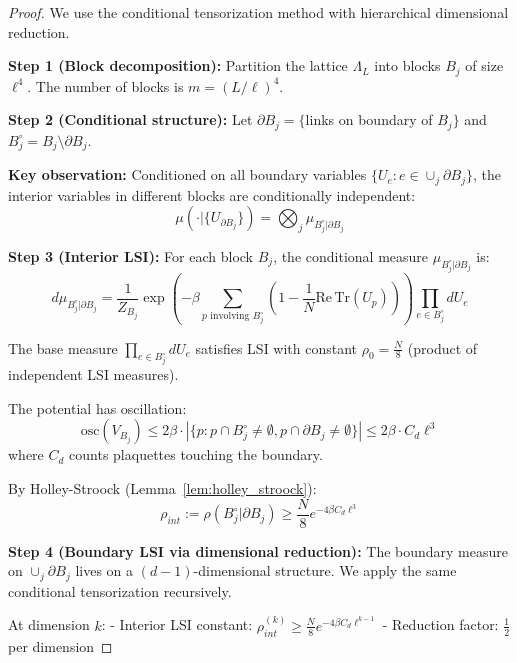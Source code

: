 \begin{proof}
We use the conditional tensorization method with hierarchical dimensional reduction.

\textbf{Step 1 (Block decomposition):}
Partition the lattice $\Lambda_L$ into blocks $B_j$ of size $\ell^4$. The number of blocks is $m = (L/\ell)^4$.

\textbf{Step 2 (Conditional structure):}
Let $\partial B_j = \{$links on boundary of $B_j\}$ and $B_j^\circ = B_j \setminus \partial B_j$.

\textbf{Key observation:} Conditioned on all boundary variables $\{U_e : e \in \cup_j \partial B_j\}$, the interior variables in different blocks are conditionally independent:
\begin{equation}
\mu(\cdot | \{U_{\partial B_j}\}) = \bigotimes_j \mu_{B_j^\circ | \partial B_j}
\end{equation}

\textbf{Step 3 (Interior LSI):}
For each block $B_j$, the conditional measure $\mu_{B_j^\circ | \partial B_j}$ is:
\begin{equation}
d\mu_{B_j^\circ | \partial B_j} = \frac{1}{Z_{B_j}} \exp\left(-\beta \sum_{p \text{ involving } B_j^\circ} (1 - \frac{1}{N}\mathrm{Re}\,\mathrm{Tr}(U_p))\right) \prod_{e \in B_j^\circ} dU_e
\end{equation}

The base measure $\prod_{e \in B_j^\circ} dU_e$ satisfies LSI with constant $\rho_0 = \frac{N}{8}$ (product of independent LSI measures).

The potential has oscillation:
\begin{equation}
\mathrm{osc}(V_{B_j}) \leq 2\beta \cdot |\{p : p \cap B_j^\circ \neq \emptyset, p \cap \partial B_j \neq \emptyset\}| \leq 2\beta \cdot C_d \ell^3
\end{equation}
where $C_d$ counts plaquettes touching the boundary.

By Holley-Stroock (Lemma~\ref{lem:holley_stroock}):
\begin{equation}
\rho_{int} := \rho(B_j^\circ | \partial B_j) \geq \frac{N}{8} e^{-4\beta C_d \ell^3}
\end{equation}

\textbf{Step 4 (Boundary LSI via dimensional reduction):}
The boundary measure on $\cup_j \partial B_j$ lives on a $(d-1)$-dimensional structure. We apply the same conditional tensorization recursively.

At dimension $k$:
- Interior LSI constant: $\rho_{int}^{(k)} \geq \frac{N}{8} e^{-4\beta C_d \ell^{k-1}}$
- Reduction factor: $\frac{1}{2}$ per dimension


\end{proof}
